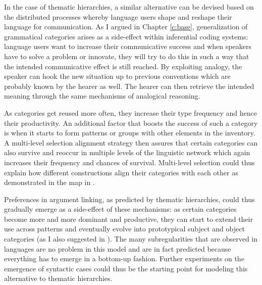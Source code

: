 In the case of thematic hierarchies, a similar alternative can be devised based on the distributed processes whereby language users shape and reshape their language for communication. As I argued in Chapter \ref{c:base}, generalization of grammatical categories arises as a side-effect within inferential coding systems: language users want to increase their communicative success and when speakers have to solve a problem or innovate, they will try to do this in such a way that the intended communicative effect is still reached. By exploiting analogy, the speaker can hook the new situation up to previous conventions which are probably known by the hearer as well. The hearer can then retrieve the intended meaning through the same mechanisms of analogical reasoning.

As categories get reused more often, they increase their type frequency and hence their productivity. An additional factor that boosts the success of such a category is when it starts to form patterns or groups with other elements in the inventory. A multi-level selection alignment strategy then assures that certain categories can also survive and reoccur in multiple levels of the linguistic network which again increases their frequency and chances of survival. Multi-level selection could thus explain how different constructions align their categories with each other as demonstrated in the map in .

Preferences in argument linking, as predicted by thematic hierarchies, could thus gradually emerge as a side-effect of these mechanisms: as certain categories become more and more dominant and productive, they can start to extend their use across patterns and eventually evolve into prototypical subject and object categories (as I also suggested in ). The many subregularities that are observed in languages are no problem in this model and are in fact predicted because everything has to emerge in a bottom-up fashion. Further experiments on the emergence of syntactic cases could thus be the starting point for modeling this alternative to thematic hierarchies.

